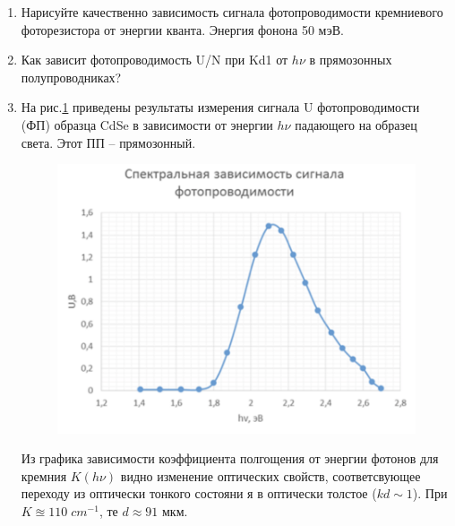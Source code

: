 \documentclass[a4paper]{article}
\begin{document}
\begin{enumerate}
    \item Нарисуйте качественно зависимость сигнала фотопроводимости кремниевого фоторезистора от энергии кванта. Энергия фонона  50 мэВ. \par 

    \item Как зависит фотопроводимость U/N при Kd1 от $h \nu$ в прямозонных полупроводниках? \par 

    \item  На рис.\ref{12} приведены результаты измерения сигнала  U фотопроводимости (ФП) образца CdSe  в зависимости от энергии $h \nu$ падающего на образец света. Этот ПП – прямозонный. \par 
    \begin{figure}[H]
        \centering
        \includegraphics[scale = 0.6]{12.png}
        \caption{}
        \label{12}
    \end{figure} 
    Из графика зависимости коэффициента полгощения от энергии фотонов для кремния $K(h \nu)$ видно изменение оптических свойств, соответсвующее переходу из оптически тонкого состояни я в оптически толстое ($kd \sim 1$). При $K \approxeq 110\; cm^{-1}$, те $d \approx 91$ мкм.

    

\end{enumerate}
\end{document}

